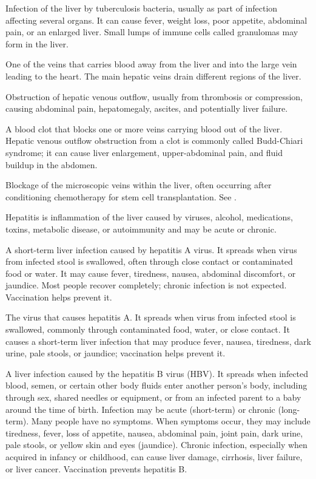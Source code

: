  Infection of the liver by tuberculosis bacteria, usually
as part of infection affecting several organs. It can cause fever, weight loss, poor
appetite, abdominal pain, or an enlarged liver. Small lumps of immune cells called
granulomas may form in the liver.

 One of the veins that carries blood away from the liver and into the large vein leading to the heart. The main hepatic veins drain different regions of the liver.

 Obstruction of hepatic venous outflow, usually from thrombosis or compression, causing abdominal pain, hepatomegaly, ascites, and potentially liver failure.

 A blood clot that blocks one or more veins carrying blood out of the liver. Hepatic venous outflow obstruction from a clot is commonly called Budd-Chiari syndrome; it can cause liver enlargement, upper-abdominal pain, and fluid buildup in the abdomen.

 Blockage of the microscopic veins within the liver, often occurring after conditioning chemotherapy for stem cell transplantation. See .

 Hepatitis is inflammation of the liver caused by viruses, alcohol, medications, toxins, metabolic disease, or autoimmunity and may be acute or chronic.

 A short-term liver infection caused by hepatitis A virus. It spreads when virus from infected stool is swallowed, often through close contact or contaminated food or water. It may cause fever, tiredness, nausea, abdominal discomfort, or jaundice. Most people recover completely; chronic infection is not expected. Vaccination helps prevent it.

 The virus that causes hepatitis A. It spreads when virus from infected stool is swallowed, commonly through contaminated food, water, or close contact. It causes a short-term liver infection that may produce fever, nausea, tiredness, dark urine, pale stools, or jaundice; vaccination helps prevent it.

 A liver infection caused by the hepatitis B virus (HBV). It spreads when infected blood, semen, or certain other body fluids enter another person’s body, including through sex, shared needles or equipment, or from an infected parent to a baby around the time of birth. Infection may be acute (short-term) or chronic (long-term). Many people have no symptoms. When symptoms occur, they may include tiredness, fever, loss of appetite, nausea, abdominal pain, joint pain, dark urine, pale stools, or yellow skin and eyes (jaundice). Chronic infection, especially when acquired in infancy or childhood, can cause liver damage, cirrhosis, liver failure, or liver cancer. Vaccination prevents hepatitis B.

